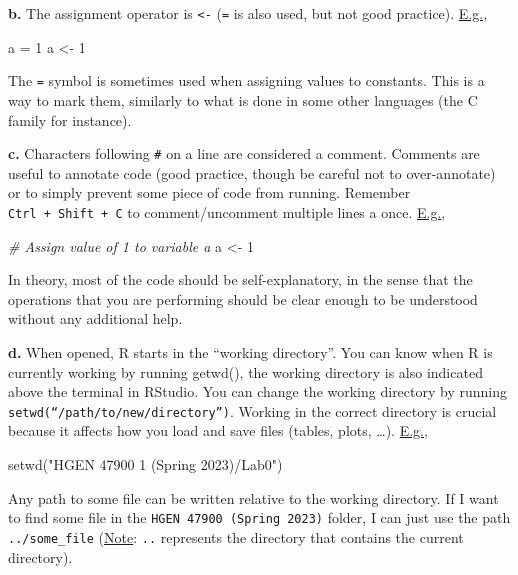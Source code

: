 \documentclass[
]{article}
\newenvironment{Shaded}{\begin{snugshade}}{\end{snugshade}}
\newcommand{\CommentTok}[1]{\textcolor[rgb]{0.56,0.35,0.01}{\textit{#1}}}
\newcommand{\DecValTok}[1]{\textcolor[rgb]{0.00,0.00,0.81}{#1}}
\newcommand{\FunctionTok}[1]{\textcolor[rgb]{0.00,0.00,0.00}{#1}}
\newcommand{\NormalTok}[1]{#1}
\newcommand{\OtherTok}[1]{\textcolor[rgb]{0.56,0.35,0.01}{#1}}
\newcommand{\StringTok}[1]{\textcolor[rgb]{0.31,0.60,0.02}{#1}}
\begin{document}
\textbf{b.} The assignment operator is \texttt{\textless{}-} (\texttt{=}
is also used, but not good practice). \underline{E.g.},

\begin{Shaded}
\begin{Highlighting}[]
\NormalTok{a }\OtherTok{=}  \DecValTok{1}
\NormalTok{a }\OtherTok{\textless{}{-}} \DecValTok{1}
\end{Highlighting}
\end{Shaded}

The \texttt{=} symbol is sometimes used when assigning values to
constants. This is a way to mark them, similarly to what is done in some
other languages (the C family for instance).

\textbf{c.} Characters following \texttt{\#} on a line are considered a
comment. Comments are useful to annotate code (good practice, though be
careful not to over-annotate) or to simply prevent some piece of code
from running. Remember \texttt{Ctrl\ +\ Shift\ +\ C} to
comment/uncomment multiple lines a once. \underline{E.g.},

\begin{Shaded}
\begin{Highlighting}[]
\CommentTok{\# Assign value of 1 to variable a}
\NormalTok{a }\OtherTok{\textless{}{-}} \DecValTok{1}
\end{Highlighting}
\end{Shaded}

In theory, most of the code should be self-explanatory, in the sense
that the operations that you are performing should be clear enough to be
understood without any additional help.

\textbf{d.} When opened, R starts in the ``working directory''. You can
know when R is currently working by running getwd(), the working
directory is also indicated above the terminal in RStudio. You can
change the working directory by running
\texttt{setwd(“/path/to/new/directory”)}. Working in the correct
directory is crucial because it affects how you load and save files
(tables, plots, \ldots). \underline{E.g.},

\begin{Shaded}
\begin{Highlighting}[]
\FunctionTok{setwd}\NormalTok{(}\StringTok{"HGEN 47900 1 (Spring 2023)/Lab0"}\NormalTok{)}
\end{Highlighting}
\end{Shaded}

Any path to some file can be written relative to the working directory.
If I want to find some file in the \texttt{HGEN\ 47900\ (Spring\ 2023)}
folder, I can just use the path \texttt{../some\_file}
(\underline{Note}: \texttt{..} represents the directory that contains
the current directory).
\end{document}
